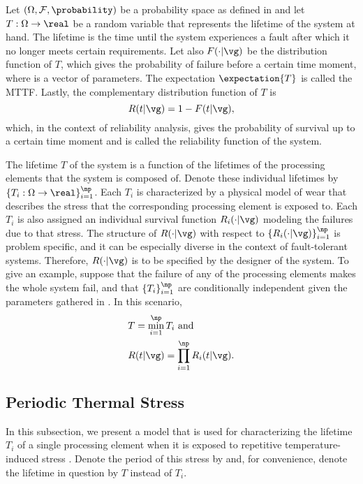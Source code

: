 \newcommand{\mean}{\mu}
\newcommand{\scale}{\eta}
\newcommand{\shape}{\beta}

Let $(\Omega, \mathcal{F}, \probability)$ be a probability space as defined in
 and let $T: \Omega \to \real$ be a random variable
that represents the lifetime of the system at hand. The lifetime is the time
until the system experiences a fault after which it no longer meets certain
requirements. Let also $F(\cdot | \vg)$ be the distribution function of $T$,
which gives the probability of failure before a certain time moment, where \vg
is a vector of parameters. The expectation $\expectation{T}$ is called the
\ac{MTTF}. Lastly, the complementary distribution function of $T$ is
\[
  R(t | \vg) = 1 - F(t | \vg),
\]
which, in the context of reliability analysis, gives the probability of survival
up to a certain time moment and is called the reliability function of the
system.

The lifetime $T$ of the system is a function of the lifetimes of the \np
processing elements that the system is composed of. Denote these individual
lifetimes by $\{ T_i: \Omega \to \real \}_{i = 1}^\np$. Each $T_i$ is
characterized by a physical model of wear \cite{jedec2016} that describes the
stress that the corresponding processing element is exposed to. Each $T_i$ is
also assigned an individual survival function $R_i(\cdot | \vg)$ modeling the
failures due to that stress. The structure of $R(\cdot | \vg)$ with respect to
$\{ R_i(\cdot | \vg) \}_{i = 1}^\np$ is problem specific, and it can be
especially diverse in the context of fault-tolerant systems. Therefore, $R(\cdot
| \vg)$ is to be specified by the designer of the system. To give an example,
suppose that the failure of any of the \np processing elements makes the whole
system fail, and that $\{ T_i \}_{i = 1}^\np$ are conditionally independent
given the parameters gathered in \vg. In this scenario,
\begin{align*}
  & T = \min_{i = 1}^\np T_i \text{ and} \\
  & R(t | \vg) = \prod_{i = 1}^\np R_i(t | \vg).
\end{align*}

\subsection{Periodic Thermal Stress}

In this subsection, we present a model that is used for characterizing the
lifetime $T_i$ of a single processing element when it is exposed to repetitive
temperature-induced stress \cite{huang2009b, xiang2010}. Denote the period of
this stress by \period and, for convenience, denote the lifetime in question by
$T$ instead of $T_i$.

